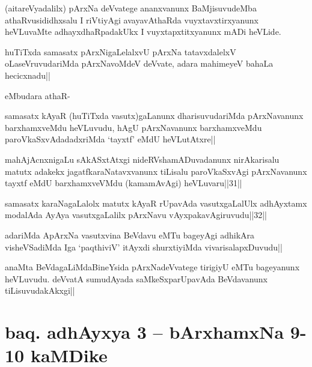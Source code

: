 
\begin{artha}
(aitareVyadalilx) pArxNa deVvatege ananxvanunx BaMjisuvudeMba athaRvusididhxsalu \stext I riVtiyAgi avayavAthaRda vuyxtavxtirxyanunx heVLuvaMte adhayxdhaRpadakUkx I vuyxtapxtitxyanunx mADi heVLide.
\end{artha}


\begin{artha}
huTiTxda samasatx pArxNigaLelalxvU pArxNa tatavxdalelxV oLaseVruvudariMda pArxNavoMdeV deVvate, adara mahimeyeV bahaLa hecicxnadu||
\end{artha}

 eMbudara athaR-

\begin{artha}
samasatx kAyaR (huTiTxda vasutx)gaLanunx dharisuvudariMda pArxNavanunx barxhamxveMdu heVLuvudu, hAgU pArxNavanunx barxhamxveMdu paroVkaSxvAdadadxriMda `tayxtf' eMdU heVLutAtxre||
\end{artha}

\begin{artha}
mahAjAcnxnigaLu sAkASxtAtxgi nideRVshamADuvadanunx nirAkarisalu matutx adakekx jagatfkaraNatavxvanunx tiLisalu paroVkaSxvAgi pArxNavanunx tayxtf eMdU barxhamxveVMdu (kamamAvAgi) heVLuvaru||31||

samasatx karaNagaLalolx matutx kAyaR rUpavAda vasutxgaLalUlx adhAyxtamx modalAda AyAya vasutxgaLalilx pArxNavu vAyxpakavAgiruvudu||32||
\end{artha}


\begin{artha}
adariMda ApArxNa vasutxvina BeVdavu eMTu bageyAgi adhikAra visheVSadiMda Iga `paqthiviV' itAyxdi shurxtiyiMda vivarisalapxDuvudu||
\end{artha}

\begin{artha}
anaMta BeVdagaLiMdaBineYsida pArxNadeVvatege tirigiyU eMTu bageyanunx heVLuvudu. deVvatA sumudAyada saMkeSxparUpavAda BeVdavanunx tiLisuvudakAkxgi||
\end{artha}

\section*{baq. adhAyxya 3 -- bArxhamxNa 9-10 kaMDike}

